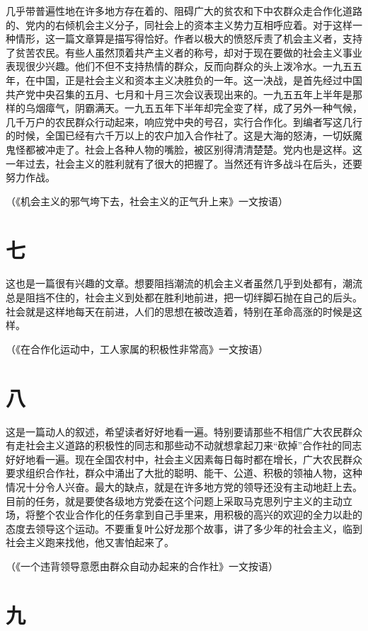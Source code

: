 几乎带普遍性地在许多地方存在着的、阻碍广大的贫农和下中农群众走合作化道路的、党内的右倾机会主义分子，同社会上的资本主义势力互相呼应着。对于这样一种情形，这一篇文章算是描写得恰好。作者以极大的愤怒斥责了机会主义者，支持了贫苦农民。有些人虽然顶着共产主义者的称号，却对于现在要做的社会主义事业表现很少兴趣。他们不但不支持热情的群众，反而向群众的头上泼冷水。一九五五年，在中国，正是社会主义和资本主义决胜负的一年。这一决战，是首先经过中国共产党中央召集的五月、七月和十月三次会议表现出来的。一九五五年上半年是那样的乌烟瘴气，阴霸满天。一九五五年下半年却完全变了样，成了另外一种气候，几千万户的农民群众行动起来，响应党中央的号召，实行合作化。到编者写这几行的时候，全国已经有六千万以上的农户加入合作社了。这是大海的怒涛，一切妖魔鬼怪都被冲走了。社会上各种人物的嘴脸，被区别得清清楚楚。党内也是这样。这一年过去，社会主义的胜利就有了很大的把握了。当然还有许多战斗在后头，还要努力作战。


（《机会主义的邪气垮下去，社会主义的正气升上来》一文按语）

\section*{七}

这也是一篇很有兴趣的文章。想要阻挡潮流的机会主义者虽然几乎到处都有，潮流总是阻挡不住的，社会主义到处都在胜利地前进，把一切绊脚石抛在自己的后头。社会就是这样地每天在前进，人们的思想在被改造着，特别在革命高涨的时候是这样。


（《在合作化运动中，工人家属的积极性非常高》一文按语）

\section*{八}

这是一篇动人的叙述，希望读者好好地看一遍。特别要请那些不相信广大农民群众有走社会主义道路的积极性的同志和那些动不动就想拿起刀来“砍掉”合作社的同志好好地看一遍。现在全国农村中，社会主义因素每日每时都在增长，广大农民群众要求组织合作社，群众中涌出了大批的聪明、能干、公道、积极的领袖人物，这种情况十分令人兴奋。最大的缺点，就是在许多地方党的领导还没有主动地赶上去。目前的任务，就是要使各级地方党委在这个问题上采取马克思列宁主义的主动立场，将整个农业合作化的任务拿到自己手里来，用积极的高兴的欢迎的全力以赴的态度去领导这个运动。不要重复叶公好龙那个故事，讲了多少年的社会主义，临到社会主义跑来找他，他又害怕起来了。


（《一个违背领导意愿由群众自动办起来的合作社》一文按语）

\section*{九}

